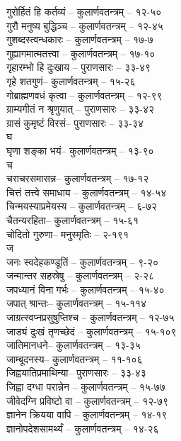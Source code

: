 \begin{raggedright}
\begin{parcolumns}[colwidths={1=.55\textwidth,2=.55\textwidth}]{2}
{गुरोर्हितं हि कर्तव्यं	– 	कुलार्णवतन्त्रम्  – १२-५०\\
गुरौ मनुष्य बुद्धिञ्च	– 	कुलार्णवतन्त्रम्  – १२-४५\\
गुशब्दस्त्वन्धकारः	– 	कुलार्णवतन्त्रम्  – १७-७\\
गुह्यागमात्मतत्त्वा	– 	कुलार्णवतन्त्रम्  – १७-१०\\
गृहारम्भो हि दुःखाय	– 	पुराणसारः   – ३३-४९	\\
गृहे शतगुणं– 	कुलार्णवतन्त्रम्  – १५-२६\\
गोब्राह्मणवधं कृत्वा	– 	कुलार्णवतन्त्रम्  – १२-९९\\
ग्राम्यगीतं न श्रृणुयात्	– 	पुराणसारः   – ३३-४२	\\
ग्रासं कुमृष्टं विरसं– 	पुराणसारः   – ३३-३४\\
{\large घ}\\
घृणा शङ्का भयं– 	 कुलार्णवतन्त्रम्  – १३-९०\\
{\large च}\\
चराचरसमासन्न– 	कुलार्णवतन्त्रम्  – १७-१२\\
चित्तं तत्त्वे समाधाय	– 	कुलार्णवतन्त्रम्  – १४-५४\\
चिन्मयस्याप्रमेयस्य	– 	कुलार्णवतन्त्रम्  – ६-७२\\
चैतन्यरहिता– 	कुलार्णवतन्त्रम्  – १५-६१\\
चोदितो गुरुणा– 	मनुस्मृतिः  – २-१९१\\
{\large ज}\\
जनः स्वदेहकण्डूतिं	– 	कुलार्णवतन्त्रम्  – ९-२०\\
जन्मान्तर सहस्रेषु	– 	कुलार्णवतन्त्रम्  – २-२८\\
जपध्यानं विनागर्भः	– 	कुलार्णवतन्त्रम्  – १५-४०\\
जपात् श्रान्तः– 	कुलार्णवतन्त्रम्  – १५-११४\\
जाग्रत्स्वप्नप्रसुषुप्तिश्च	– 	कुलार्णवतन्त्रम्  – १२-७५\\
जाड्यं दुःखं तृणच्छेदं	– 	कुलार्णवतन्त्रम्  – १५-१०९\\
जातिमानधने– 	कुलार्णवतन्त्रम्  – १३-३५\\
जाम्बूदनस्य– 	कुलार्णवतन्त्रम्  – ११-१०६\\
जिह्वयातिप्रमाथिन्या– 	पुराणसारः   – ३३-४३	\\
जिह्वा दग्धा परान्नेन	– 	कुलार्णवतन्त्रम्  – १५-७७\\
जीवेदग्नि प्रविष्टो वा	– 	कुलार्णवतन्त्रम्  – १२-७९\\
ज्ञानेन क्रियया वापि	– 	कुलार्णवतन्त्रम्  – १४-१९\\
ज्ञानोपदेशसामर्थ्यं	– 	कुलार्णवतन्त्रम्  – १४-२६\\
}
\end{parcolumns}
\end{raggedright}
